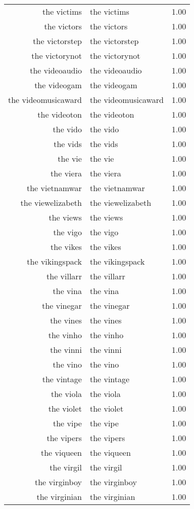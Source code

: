 \begin{table}[ht]
\begin{tabular}{rlr}
  the victims & the victims & 1.00 \\ 
  the victors & the victors & 1.00 \\ 
  the victorstep & the victorstep & 1.00 \\ 
  the victorynot & the victorynot & 1.00 \\ 
  the videoaudio & the videoaudio & 1.00 \\ 
  the videogam & the videogam & 1.00 \\ 
  the videomusicaward & the videomusicaward & 1.00 \\ 
  the videoton & the videoton & 1.00 \\ 
  the vido & the vido & 1.00 \\ 
  the vids & the vids & 1.00 \\ 
  the vie & the vie & 1.00 \\ 
  the viera & the viera & 1.00 \\ 
  the vietnamwar & the vietnamwar & 1.00 \\ 
  the viewelizabeth & the viewelizabeth & 1.00 \\ 
  the views & the views & 1.00 \\ 
  the vigo & the vigo & 1.00 \\ 
  the vikes & the vikes & 1.00 \\ 
  the vikingspack & the vikingspack & 1.00 \\ 
  the villarr & the villarr & 1.00 \\ 
  the vina & the vina & 1.00 \\ 
  the vinegar & the vinegar & 1.00 \\ 
  the vines & the vines & 1.00 \\ 
  the vinho & the vinho & 1.00 \\ 
  the vinni & the vinni & 1.00 \\ 
  the vino & the vino & 1.00 \\ 
  the vintage & the vintage & 1.00 \\ 
  the viola & the viola & 1.00 \\ 
  the violet & the violet & 1.00 \\ 
  the vipe & the vipe & 1.00 \\ 
  the vipers & the vipers & 1.00 \\ 
  the viqueen & the viqueen & 1.00 \\ 
  the virgil & the virgil & 1.00 \\ 
  the virginboy & the virginboy & 1.00 \\ 
  the virginian & the virginian & 1.00 \\ 

\end{tabular}
\end{table}
